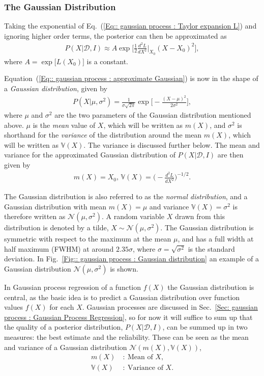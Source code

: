 \documentclass[twoside,english]{uiofysmaster}
\begin{document}
\subsubsection{The Gaussian Distribution}\label{Sec:: gaussian process : The Gaussian Distribution}

Taking the exponential of Eq.~(\ref{Eq:: gaussian process : Taylor expansion L}) and ignoring higher order terms, the posterior can then be approximated as
\begin{align}\label{Eq:: gaussian process : approximate Gaussian}
P(X | \mathcal{D}, I) \approx A \exp \Bigg[ \frac{1}{2} \frac{d^2L}{dX^2}\Big|_{X_0} (X-X_0)^2 \Bigg], 
\end{align} 
where $A = \exp \big[L(X_0) \big]$ is a constant. 

Equation~(\ref{Eq:: gaussian process : approximate Gaussian}) is now in the shape of a \textit{Gaussian distribution}, given by
\begin{align}
P(X| \mu, \sigma^2) = \frac{1}{\sigma \sqrt{2 \pi}} \exp \Bigg[ - \frac{(X- \mu)^2}{2 \sigma^2} \Bigg],
\end{align}
where $\mu$ and $\sigma^2$ are the two parameters of the Gaussian distribution mentioned above. $\mu$ is the \textit{mean} value of $X$, which will be written as $ m(X)$, and $\sigma^2$ is shorthand for the \textit{variance} of the distribution around the mean $m(X)$, which will be written as $\mathbb{V}(X)$. The variance is discussed further below. The mean and variance for the approximated Gaussian distribution of $P(X|\mathcal{D}, I)$ are then given by
\begin{align}
m(X) = X_0\text{, } \mathbb{V}(X) = \Big( - \frac{d^2L}{dX^2} \Big)^{-1/2}.
\end{align}

The Gaussian distribution is also referred to as the \textit{normal distribution}, and a Gaussian distribution with mean $m(X)= \mu$ and variance $\mathbb{V}(X)=\sigma^2$ is therefore written as $\mathcal{N}(\mu, \sigma^2)$. A random variable $X$ drawn from this distribution is denoted by a tilde, $X \sim \mathcal{N}(\mu, \sigma^2)$. The Gaussian distribution is symmetric with respect to the maximum at the mean $\mu$, and has a full width at half maximum (FWHM) at around $2.35 \sigma$, where $\sigma = \sqrt{\sigma^2}$ is the standard deviation. In Fig.~\ref{Fig:: gaussian process : Gaussian distribution} an example of a Gaussian distribution $\mathcal{N}(\mu, \sigma^2)$ is shown. 

In Gaussian process regression of a function $f(X)$ the Gaussian distribution is central, as the basic idea is to predict a Gaussian distribution over function values $f(X)$ for each $X$. Gaussian processes are discussed in Sec.~\ref{Sec: gaussian process : Gaussian Process Regression}, so for now it will suffice to sum up that the quality of a posterior distribution, $P(X| \mathcal{D}, I)$, can be summed up in two measures: the best estimate and the reliability. These can be seen as the mean and variance of a Gaussian distribution $\mathcal{N}(m(X), \mathbb{V}(X))$,
\begin{align}
m(X)~&:~ \text{Mean of }X,\\
\mathbb{V}(X)~&:~ \text{Variance of }X.
\end{align}
\end{document}
